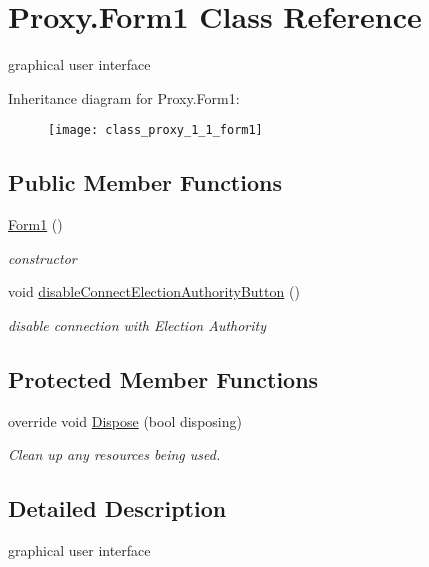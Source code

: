 \hypertarget{class_proxy_1_1_form1}{}\section{Proxy.\+Form1 Class Reference}
\label{class_proxy_1_1_form1}


graphical user interface  


Inheritance diagram for Proxy.\+Form1\+:\begin{figure}[H]
\begin{center}
\leavevmode
\texttt{[image: class\_proxy\_1\_1\_form1]}
\end{center}
\end{figure}
\subsection*{Public Member Functions}
\begin{DoxyCompactItemize}
\item 
\hyperlink{class_proxy_1_1_form1_a3b416e1ea6edf17416d0a4b1de350f91}{Form1} ()
\begin{DoxyCompactList}\small\item\em constructor \end{DoxyCompactList}\item 
void \hyperlink{class_proxy_1_1_form1_aa4eac396d43e45368f6a89379498efb6}{disable\+Connect\+Election\+Authority\+Button} ()
\begin{DoxyCompactList}\small\item\em disable connection with Election Authority \end{DoxyCompactList}\end{DoxyCompactItemize}
\subsection*{Protected Member Functions}
\begin{DoxyCompactItemize}
\item 
override void \hyperlink{class_proxy_1_1_form1_a37412c745d716eac368b0f6c75d66efb}{Dispose} (bool disposing)
\begin{DoxyCompactList}\small\item\em Clean up any resources being used. \end{DoxyCompactList}\end{DoxyCompactItemize}


\subsection{Detailed Description}
graphical user interface 



